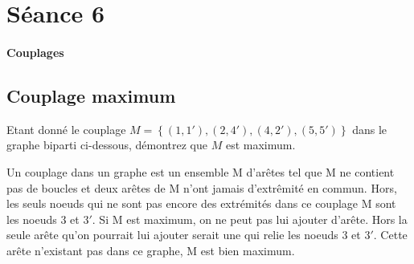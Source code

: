 \section{Séance 6}

\paragraph{Couplages}

\subsection{Couplage maximum}
Etant donné le couplage $M = \left\lbrace  (1,1'), (2,4'),(4,2'),(5,5')  \right\rbrace$ dans le graphe biparti ci-dessous, démontrez que $M$ est maximum.

\begin{figure}[h!]
  \begin{center}
  \end{center}
\end{figure}
\begin{solution}
Un couplage dans un graphe est un ensemble M d’arêtes tel que
M ne contient pas de boucles et deux arêtes de M n’ont jamais
d’extrêmité en commun. Hors, les seuls noeuds qui ne sont pas encore des extrémités dans ce couplage M sont les noeuds $3$ et $3'$. Si M est maximum, on ne peut pas lui ajouter d'arête. Hors la seule arête qu'on pourrait lui ajouter serait une qui relie les noeuds $3$ et $3'$. Cette arête n'existant pas dans ce graphe, M est bien maximum.
\end{solution}

